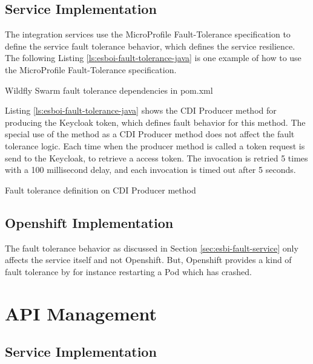 \subsection{Service Implementation}
\label{sec:esbi-fault-service}
The integration services use the MicroProfile Fault-Tolerance specification to define the service fault tolerance behavior, which defines the service resilience. The following Listing \vref{ls:esboi-fault-tolerance-java} is one example of how to use the MicroProfile Fault-Tolerance specification.

\begin{listing}
	\caption{Wildfly Swarm fault tolerance dependencies in pom.xml}
	\label{ls:esboi-fault-tolerance-pom}
\end{listing}

Listing \vref{ls:esboi-fault-tolerance-java} shows the CDI Producer method for producing the Keycloak token, which defines fault behavior for this method. The special use of the method as a CDI Producer method does not affect the fault tolerance logic. Each time when the producer method is called a token request is send to the Keycloak, to retrieve a access token. The invocation is retried 5 times with a 100 millisecond delay, and each invocation is timed out after 5 seconds.

\begin{listing}
	\caption{Fault tolerance definition on CDI Producer method}
	\label{ls:esboi-fault-tolerance-java}
\end{listing} 

\subsection{Openshift Implementation}
\label{sec:esbi-fault-openshift}
The fault tolerance behavior as discussed in Section \vref{sec:esbi-fault-service} only affects the service itself and not Openshift. But, Openshift provides a kind of fault tolerance by for instance restarting a Pod which has crashed.

\section{API Management}
\label{sec:esbi-api}

\subsection{Service Implementation}
\label{sec:esbi-api-service}

